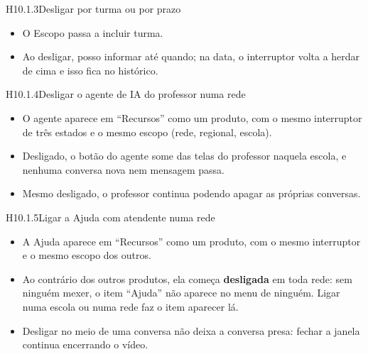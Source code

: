 \begin{historia}{H10.1.3}{Desligar por turma ou por prazo}{\afazer}
\aceiteproposta
\begin{itemize}
  \item O Escopo passa a incluir turma.
  \item Ao desligar, posso informar até quando; na data, o interruptor volta a
    herdar de cima e isso fica no histórico.
\end{itemize}
\end{historia}

\begin{historia}{H10.1.4}{Desligar o agente de IA do professor numa rede}{\parcial}
\aceite
\begin{itemize}
  \item O agente aparece em \enquote{Recursos} como um produto, com o mesmo
    interruptor de três estados e o mesmo escopo (rede, regional, escola).
  \item Desligado, o botão do agente some das telas do professor naquela
    escola, e nenhuma conversa nova nem mensagem passa.
  \item Mesmo desligado, o professor continua podendo apagar as próprias
    conversas.
\end{itemize}
\end{historia}

\begin{historia}{H10.1.5}{Ligar a Ajuda com atendente numa rede}{\parcial}
\aceite
\begin{itemize}
  \item A Ajuda aparece em \enquote{Recursos} como um produto, com o mesmo
    interruptor e o mesmo escopo dos outros.
  \item Ao contrário dos outros produtos, ela começa \textbf{desligada} em
    toda rede: sem ninguém mexer, o item \enquote{Ajuda} não aparece no menu de
    ninguém. Ligar numa escola ou numa rede faz o item aparecer lá.
  \item Desligar no meio de uma conversa não deixa a conversa presa: fechar a
    janela continua encerrando o vídeo.
\end{itemize}
\end{historia}

